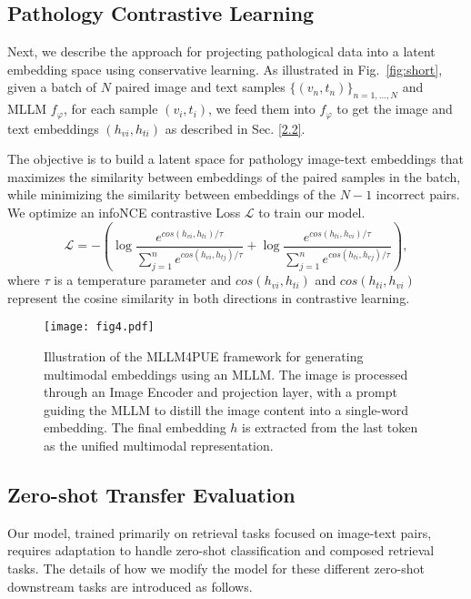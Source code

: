 \subsection{Pathology Contrastive Learning}\label{2.3}
Next, we describe the approach for projecting pathological data into a latent embedding space using conservative learning.
As illustrated in Fig.~\ref{fig:short}, given a batch of $N$ paired image and text samples $\{(v_n, t_n)\}_{n=1,\dots,N}$ and MLLM $f_{\varphi}$, for each sample $(v_i, t_i)$, we feed them into $f_{\varphi}$ to get the image and text embeddings $(h_{vi}, h_{ti})$ as described in Sec. \ref{2.2}.

The objective is to build a latent space for pathology image-text embeddings that maximizes the similarity between embeddings of the paired samples in the batch, while minimizing the similarity between embeddings of the $N-1$ incorrect pairs. We optimize an infoNCE contrastive Loss $\mathcal {L}$ to train our model.
\begin{equation}
\mathcal {L}=-(\log \frac {e^{cos(h_{vi}, h_{ti})/ \tau }}{\sum _{j=1}^{n}e^{cos(h_{vi}, h_{tj})/ \tau }} + \log \frac {e^{cos(h_{ti}, h_{vi})/ \tau }}{\sum _{j=1}^{n}e^{cos(h_{ti}, h_{vj})/ \tau}}),
\end{equation}
where $\tau$ is a temperature parameter and
$cos(h_{vi}, h_{ti})$ and $cos(h_{ti}, h_{vi})$ represent the cosine similarity in both directions in contrastive learning.

\begin{figure}
   \centering  
  \texttt{[image: fig4.pdf]}  
  \caption{Illustration of the MLLM4PUE framework for generating multimodal embeddings using an MLLM. The image is processed through an Image Encoder and projection layer, with a prompt guiding the MLLM to distill the image content into a single-word embedding. The final embedding $h$ is extracted from the last token as the unified multimodal representation.}  
  \label{f3} 
  \vspace{-1ex}
\end{figure}
\subsection{Zero-shot Transfer Evaluation}\label{2.4}
Our model, trained primarily on retrieval tasks focused on image-text pairs, requires adaptation to handle zero-shot classification and composed retrieval tasks. The details of how we modify the model for these different zero-shot downstream tasks are introduced as follows. 

